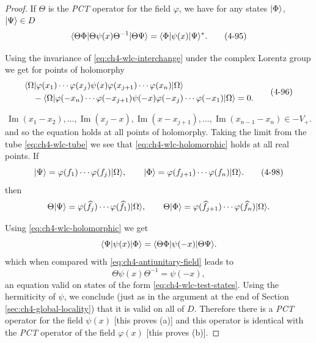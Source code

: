 \begin{proof}
If $\Theta$ is the \emph{PCT} operator for the field $\varphi$, we have for
any states $\lvert \Phi\rangle$, $\lvert \Psi\rangle\in D$
\begin{equation}
  \langle \Theta\Phi\vert \Theta\psi(x)\Theta^{-1}\vert \Theta\Psi\rangle
  =
  \langle \Phi\vert \psi(x)\vert \Psi\rangle^{*}.
  \tag{4-95}\label{eq:ch4-antiunitary-field}
\end{equation}

Using the invariance of \eqref{eq:ch4-wlc-interchange} under the complex Lorentz group we get for
points of holomorphy
\begin{equation}
\begin{aligned}
 &\langle \Omega\rvert\varphi(x_1)\cdots\varphi(x_j)\psi(x)
   \varphi(x_{j+1})\cdots\varphi(x_n)\lvert \Omega\rangle\\
 &\quad -
   \langle \Omega\rvert\varphi(-x_n)\cdots\varphi(-x_{j+1})\psi(-x)
   \varphi(-x_j)\cdots\varphi(-x_1)\lvert \Omega\rangle=0.
\end{aligned}
\tag{4-96}\label{eq:ch4-wlc-holomorphic}
\end{equation}

\begin{equation}
  \operatorname{Im}(x_1-x_2),\ldots,\operatorname{Im}(x_j-x),
  \operatorname{Im}(x-x_{j+1}),\ldots,
  \operatorname{Im}(x_{n-1}-x_n)\in -V_+.
  \tag{4-97}\label{eq:ch4-wlc-tube}
\end{equation}
and so the equation holds at all points of holomorphy. Taking the limit from
the tube \eqref{eq:ch4-wlc-tube} we see that \eqref{eq:ch4-wlc-holomorphic} holds at all real points. If
\begin{equation}
  \lvert \Psi\rangle
    =\varphi(f_1)\cdots\varphi(f_j)\lvert \Omega\rangle,
  \qquad
  \lvert \Phi\rangle
    =\varphi(f_{j+1})\cdots\varphi(f_n)\lvert \Omega\rangle.
  \tag{4-98}\label{eq:ch4-wlc-test-states}
\end{equation}
then
\begin{equation*}
  \Theta\lvert \Psi\rangle
    =\varphi(\widehat f_j)\cdots\varphi(\widehat f_1)\lvert \Omega\rangle,
  \qquad
  \Theta\lvert \Phi\rangle
    =\varphi(\widehat f_{j+1})\cdots\varphi(\widehat f_n)\lvert \Omega\rangle.
\end{equation*}

Using \eqref{eq:ch4-wlc-holomorphic} we get
\begin{equation*}
  \langle \Psi\vert \psi(x)\vert \Phi\rangle
  =\langle \Theta\Phi\vert \psi(-x)\vert \Theta\Psi\rangle.
\end{equation*}
which when compared with \eqref{eq:ch4-antiunitary-field} leads to
\begin{equation*}
  \Theta\psi(x)\Theta^{-1}=\psi(-x),
\end{equation*}
an equation valid on states of the form \eqref{eq:ch4-wlc-test-states}. Using the hermiticity of
$\psi$, we conclude (just as in the argument at the end of Section \ref{sec:ch4-global-locality}) that
it is valid on all of $D$. Therefore there is a \emph{PCT} operator for the
field $\psi(x)$ [this proves (a)] and this operator is identical with the
\emph{PCT} operator of the field $\varphi(x)$ [this proves (b)].
\end{proof}

